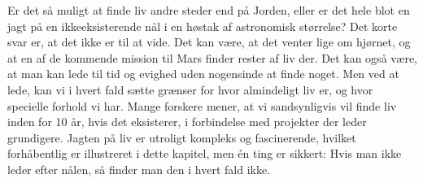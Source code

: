 
Er det så muligt at finde liv andre steder end på Jorden, eller er det hele blot en jagt på en ikkeeksisterende nål i en høstak af astronomisk størrelse? Det korte svar er, at det ikke er til at vide. Det kan være, at det venter lige om hjørnet, og at en af de kommende mission til Mars finder rester af liv der. Det kan også være, at man kan lede til tid og evighed uden nogensinde at finde noget. Men ved at lede, kan vi i hvert fald sætte grænser for hvor almindeligt liv er, og hvor specielle forhold vi har. Mange forskere mener, at vi sandsynligvis vil finde liv inden for 10 år, hvis det eksisterer, i forbindelse med projekter der leder grundigere.
Jagten på liv er utroligt kompleks og fascinerende, hvilket forhåbentlig er illustreret i dette kapitel, men én ting er sikkert: Hvis man ikke leder efter nålen, så finder man den i hvert fald ikke.